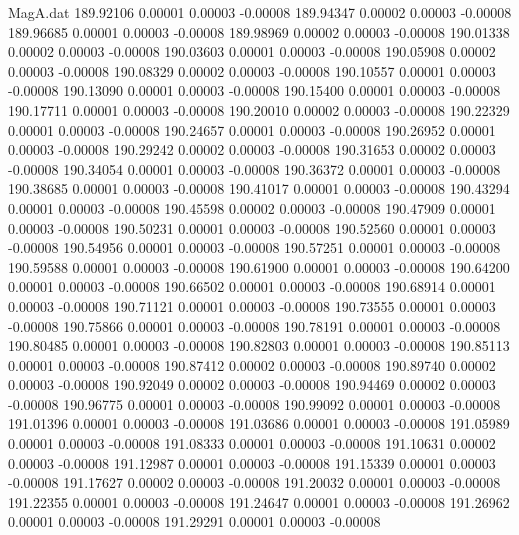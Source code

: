 \begin{filecontents}{MagA.dat}
 189.92106    0.00001    0.00003   -0.00008
 189.94347    0.00002    0.00003   -0.00008
 189.96685    0.00001    0.00003   -0.00008
 189.98969    0.00002    0.00003   -0.00008
 190.01338    0.00002    0.00003   -0.00008
 190.03603    0.00001    0.00003   -0.00008
 190.05908    0.00002    0.00003   -0.00008
 190.08329    0.00002    0.00003   -0.00008
 190.10557    0.00001    0.00003   -0.00008
 190.13090    0.00001    0.00003   -0.00008
 190.15400    0.00001    0.00003   -0.00008
 190.17711    0.00001    0.00003   -0.00008
 190.20010    0.00002    0.00003   -0.00008
 190.22329    0.00001    0.00003   -0.00008
 190.24657    0.00001    0.00003   -0.00008
 190.26952    0.00001    0.00003   -0.00008
 190.29242    0.00002    0.00003   -0.00008
 190.31653    0.00002    0.00003   -0.00008
 190.34054    0.00001    0.00003   -0.00008
 190.36372    0.00001    0.00003   -0.00008
 190.38685    0.00001    0.00003   -0.00008
 190.41017    0.00001    0.00003   -0.00008
 190.43294    0.00001    0.00003   -0.00008
 190.45598    0.00002    0.00003   -0.00008
 190.47909    0.00001    0.00003   -0.00008
 190.50231    0.00001    0.00003   -0.00008
 190.52560    0.00001    0.00003   -0.00008
 190.54956    0.00001    0.00003   -0.00008
 190.57251    0.00001    0.00003   -0.00008
 190.59588    0.00001    0.00003   -0.00008
 190.61900    0.00001    0.00003   -0.00008
 190.64200    0.00001    0.00003   -0.00008
 190.66502    0.00001    0.00003   -0.00008
 190.68914    0.00001    0.00003   -0.00008
 190.71121    0.00001    0.00003   -0.00008
 190.73555    0.00001    0.00003   -0.00008
 190.75866    0.00001    0.00003   -0.00008
 190.78191    0.00001    0.00003   -0.00008
 190.80485    0.00001    0.00003   -0.00008
 190.82803    0.00001    0.00003   -0.00008
 190.85113    0.00001    0.00003   -0.00008
 190.87412    0.00002    0.00003   -0.00008
 190.89740    0.00002    0.00003   -0.00008
 190.92049    0.00002    0.00003   -0.00008
 190.94469    0.00002    0.00003   -0.00008
 190.96775    0.00001    0.00003   -0.00008
 190.99092    0.00001    0.00003   -0.00008
 191.01396    0.00001    0.00003   -0.00008
 191.03686    0.00001    0.00003   -0.00008
 191.05989    0.00001    0.00003   -0.00008
 191.08333    0.00001    0.00003   -0.00008
 191.10631    0.00002    0.00003   -0.00008
 191.12987    0.00001    0.00003   -0.00008
 191.15339    0.00001    0.00003   -0.00008
 191.17627    0.00002    0.00003   -0.00008
 191.20032    0.00001    0.00003   -0.00008
 191.22355    0.00001    0.00003   -0.00008
 191.24647    0.00001    0.00003   -0.00008
 191.26962    0.00001    0.00003   -0.00008
 191.29291    0.00001    0.00003   -0.00008

\end{filecontents}
